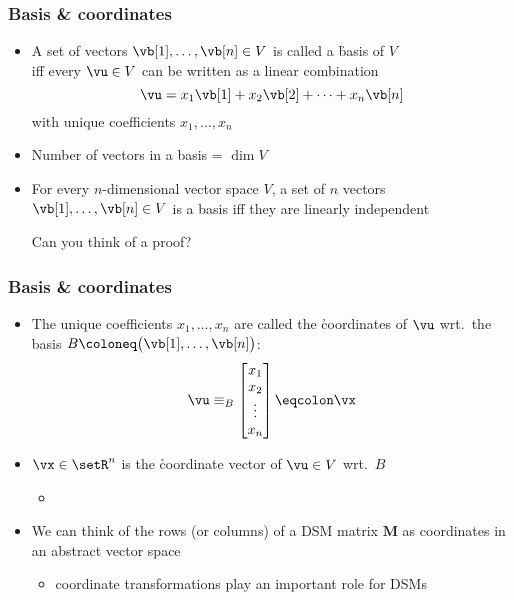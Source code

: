 \begin{frame}
  \frametitle{Basis \& coordinates}

  \begin{itemize}
  \item A set of vectors $\vb[1], \ldots, \vb[n] \in V$ is called a
    \h{basis} of $V$\\ iff every $\vu\in V$ can be written as a linear
    combination
    \[ 
    \vu = x_1 \vb[1] + x_2 \vb[2] + \dots + x_n \vb[n]
    \]
    with unique coefficients $x_1, \ldots, x_n$
  \item Number of vectors in a basis = $\dim V$%
    \pause\gap
  \item For every $n$-dimensional vector space $V$, a set of $n$ vectors
    $\vb[1], \ldots, \vb[n]\in V$ is a basis iff they are linearly independent
    \begin{itemize}
    \itemhand Can you think of a proof?
    \end{itemize}
  \end{itemize}
\end{frame}

\begin{frame}
  \frametitle{Basis \& coordinates}

  \begin{itemize}
  \item The unique coefficients $x_1, \ldots, x_n$ are called the
    \h{coordinates} of $\vu$ wrt.\ the basis $B \coloneq \bigl( \vb[1], \ldots,
      \vb[n] \bigr)$:
    \[ 
    \vu \equiv_B
    \begin{bmatrix}
      x_1\\ x_2\\ \vdots\\ x_n
    \end{bmatrix}
    \eqcolon \vx
    \]
    \pause
  \item $\vx\in \setR^n$ is the \h{coordinate vector} of $\vu\in V$ wrt.\ $B$
    \begin{itemize}
      \itemhand $V$ is isomorphic to $\setR^n$ by virtue of this
      correspondence
    \item[]\pause
    \end{itemize}
  \item We can think of the rows (or columns) of a DSM matrix $\mathbf{M}$ as
    coordinates in an abstract vector space
    \begin{itemize}
    \item coordinate transformations play an important role for DSMs
    \end{itemize}
  \end{itemize}
\end{frame}

